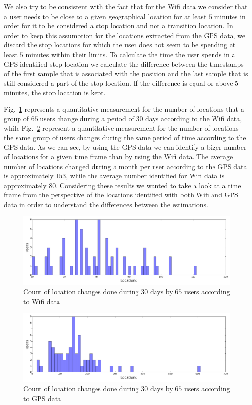 We also try to be consistent with the fact that for the Wifi data we consider
that a user needs to be close to a given geographical location for at least $5$
minutes in order for it to be considered a stop location and not a transition
location. In order to keep this assumption for the locations extracted from the
GPS data, we discard the stop locations for which the user does not seem to be
spending at least $5$ minutes within their limits. To calculate the time the
user spends in a GPS identified stop location we calculate the difference
between the timestamps of the first sample that is associated with the position
and the last sample that is still considered a part of the stop location. If the
difference is equal or above $5$ minutes, the stop location is kept.

Fig.~\ref{loc_wifi_data} represents a quantitative measurement for the number of
locations that a group of $65$ users change during a period of $30$ days
according to the Wifi data, while Fig.~\ref{loc_gps_data} represent a
quantitative measurement for the number of locations the same group of users
changes during the same period of time according to the GPS data. As we can see,
by using the GPS data we can identify a biger number of locations for a given
time frame than by using the Wifi data. The average number of locations changed
during a month per user according to the GPS data is approximately $153$, while
the average number identified for Wifi data is approximately $80$. Considering
these results we wanted to take a look at a time frame from the perspective of
the locations identified with both Wifi and GPS data in order to understand the
differences between the estimations.

\begin{figure}[!h]
\centering
\includegraphics[width=\textwidth]{figures/gps/distribution_loc_wifi.png}
\caption{Count of location changes done during $30$ days by $65$ users
according to Wifi data}
\label{loc_wifi_data}
\end{figure}

\begin{figure}[!h]
\centering
\includegraphics[width=\textwidth]{figures/gps/distribution_loc_gps.png}
\caption{Count of location changes done during $30$ days by $65$ users
according to GPS data}
\label{loc_gps_data}
\end{figure}


